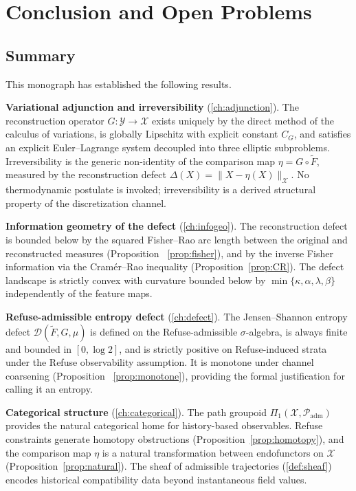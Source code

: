 \documentclass[12pt, oneside]{memoir}
\newcommand{\X}{\mathcal{X}}
\newcommand{\Ft}{\widetilde{F}}
\newcommand{\Padm}{\mathcal{P}_{\mathrm{adm}}}
\newcommand{\nnorm}[1]{\lVert #1 \rVert}
\begin{document}
\chapter{Conclusion and Open Problems}
\label{ch:conclusion}

\section{Summary}

This monograph has established the following results.

\medskip\noindent
\textbf{Variational adjunction and irreversibility}
(\cref{ch:adjunction}).  The reconstruction operator $G: \mathcal{Y} \to \X$ exists
uniquely by the direct method of the calculus of variations, is globally Lipschitz with
explicit constant $C_G$, and satisfies an explicit Euler--Lagrange system decoupled into
three elliptic subproblems.  Irreversibility is the generic non-identity of the comparison
map $\eta = G \circ \Ft$, measured by the reconstruction defect $\Delta(X) = \nnorm{X -
\eta(X)}_\X$.  No thermodynamic postulate is invoked; irreversibility is a derived
structural property of the discretization channel.

\medskip\noindent
\textbf{Information geometry of the defect}
(\cref{ch:infogeo}).  The reconstruction defect is bounded below by the squared
Fisher--Rao arc length between the original and reconstructed measures (Proposition~%
\ref{prop:fisher}), and by the inverse Fisher information via the Cramér--Rao inequality
(Proposition~\ref{prop:CR}).  The defect landscape is strictly convex with curvature
bounded below by $\min\{\kappa, \alpha, \lambda, \beta\}$ independently of the feature
maps.

\medskip\noindent
\textbf{Refuse-admissible entropy defect}
(\cref{ch:defect}).  The Jensen--Shannon entropy defect $\mathcal{D}(\Ft, G, \mu)$
is defined on the Refuse-admissible $\sigma$-algebra, is always finite and bounded in
$[0, \log 2]$, and is strictly positive on Refuse-induced strata under the Refuse
observability assumption.  It is monotone under channel coarsening (Proposition~%
\ref{prop:monotone}), providing the formal justification for calling it an entropy.

\medskip\noindent
\textbf{Categorical structure}
(\cref{ch:categorical}).  The path groupoid $\Pi_1(\X, \Padm)$ provides the natural
categorical home for history-based observables.  Refuse constraints generate homotopy
obstructions (Proposition~\ref{prop:homotopy}), and the comparison map $\eta$ is a
natural transformation between endofunctors on $\X$ (Proposition~\ref{prop:natural}).
The sheaf of admissible trajectories (\cref{def:sheaf}) encodes historical compatibility
data beyond instantaneous field values.
\end{document}
